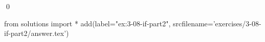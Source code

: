 
\begin{ex}
  \label{ex:3-08-if-part2}
  
  \qed
\end{ex}
\begin{python0}
from solutions import *
add(label="ex:3-08-if-part2",
    srcfilename='exercises/3-08-if-part2/answer.tex')
\end{python0}
